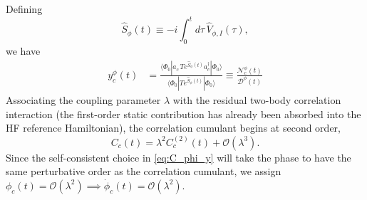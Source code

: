 Defining
\begin{equation}
    \hat S_\phi(t)
    \equiv
    -i\int_0^t d\tau\,
    \hat V_{\phi,I}(\tau),
\end{equation}
we have
\begin{align}
    y_c^\phi(t)
    &=
    \frac{
    \langle\Phi_0|
    a_c\,
    T e^{\hat S_\phi(t)}
    a_c^\dagger
    |\Phi_0\rangle
    }{
    \langle\Phi_0|
    T e^{\hat S_\phi(t)}
    |\Phi_0\rangle
    } \equiv \frac{\mathcal N_c^\phi(t)}
         {\mathcal D^\phi(t)}
\end{align}
Associating the coupling parameter $\lambda$ with the
residual two-body correlation interaction (the
first-order static contribution has already been absorbed into the
HF reference Hamiltonian), the correlation cumulant begins at
second order,
\begin{equation}
    C_c(t)
    =
    \lambda^2 C_c^{(2)}(t)
    +
    \mathcal O(\lambda^3).
\end{equation}
Since the self-consistent choice in \ref{eq:C_phi_y} will take the phase to have
the same perturbative order as the correlation cumulant, we assign $
    \phi_c(t)=\mathcal O(\lambda^2) \implies
    \dot{\phi}_c(t)=\mathcal O(\lambda^2)$.


